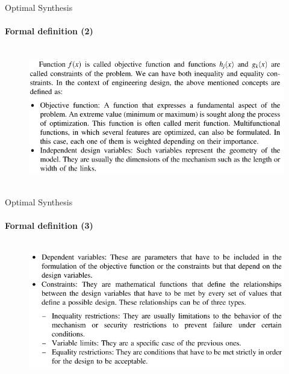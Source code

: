 \documentclass[aspectratio=169]{beamer}
\begin{document}
\begin{frame}[t]{Optimal Synthesis}
    \framesubtitle{Formal definition (2)}
    \vspace{-0.7cm}
    \begin{figure}[H]
        \centering\includegraphics[height=6cm,width=1\textwidth,keepaspectratio]{opti_gen2.png}
        \label{fig:opti_gen2.png}
    \end{figure}
\end{frame}

\begin{frame}[t]{Optimal Synthesis}
    \framesubtitle{Formal definition (3)}
    \vspace{-0.7cm}
    \begin{figure}[H]
        \centering\includegraphics[height=6cm,width=1\textwidth,keepaspectratio]{opti_gen2_5.png}
        \label{fig:opti_gen2_5.png}
    \end{figure}
\end{frame}
\end{document}

